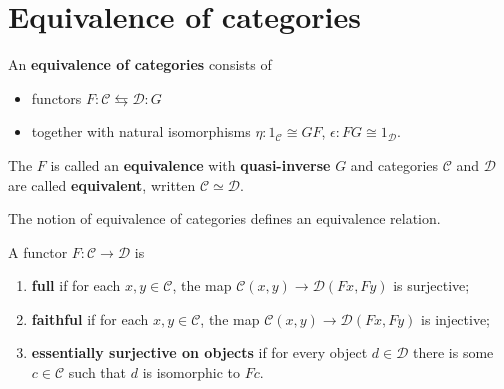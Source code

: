 \documentclass[12pt, oneside]{book}
\begin{document}
\section{Equivalence of categories} %
\begin{definition}
    An \textbf{equivalence of categories} consists of
    \begin{itemize}
        \item
              functors $F: \mathcal{C} \leftrightarrows \mathcal{D}: G$
        \item
              together with natural isomorphisms $\eta: 1_{\mathcal{C}} \cong G F$, $ \epsilon: F G \cong 1_{\mathcal{D}}$.
    \end{itemize}
    The $F$ is called an \textbf{equivalence} with \textbf{quasi-inverse} $G$ and categories $\mathcal{C}$ and $\mathcal{D}$ are called \textbf{equivalent}, written $\mathcal{C} \simeq \mathcal{D}$.
    \begin{remark}
        The notion of equivalence of categories defines an equivalence relation.
    \end{remark}
\end{definition}
\begin{definition}
    A functor $F: \mathcal{C} \rightarrow \mathcal{D}$ is
    \begin{enumerate}
        \item
              \textbf{full} if for each $x, y \in \mathcal{C}$, the map $\mathcal{C}(x, y) \rightarrow \mathcal{D}(F x, F y)$ is surjective;
        \item
              \textbf{faithful} if for each $x, y \in \mathcal{C}$, the map $\mathcal{C}(x, y) \rightarrow \mathcal{D}(F x, F y)$ is injective;
        \item
              \textbf{essentially surjective on objects} if for every object $d \in \mathcal{D}$ there is some $c \in \mathcal{C}$ such that $d$ is isomorphic to $F c$.
    \end{enumerate}
\end{definition}
\end{document}

